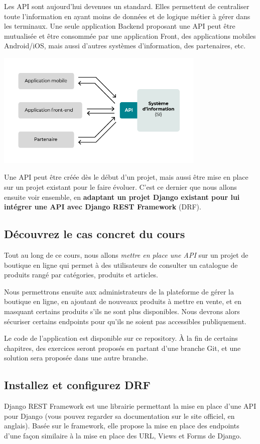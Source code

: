 \documentclass[a4paper]{article}
\begin{document}
Les API sont aujourd’hui devenues un standard. Elles permettent de centraliser toute l’information en ayant moins de données et de logique métier à gérer dans les terminaux. Une seule application Backend proposant une API peut être mutualisée et être consommée par une application Front, des applications mobiles Android/iOS, mais aussi d’autres systèmes d’information, des partenaires, etc.

\begin{center}
\includegraphics[width=10cm]{images/image01.png}
\end{center}

Une API peut être créée dès le début d’un projet, mais aussi être mise en place sur un projet existant pour le faire évoluer. C’est ce dernier que nous allons ensuite voir ensemble, en {\bf adaptant un projet Django existant pour lui intégrer une API avec {\color{monOrange}Django REST Framework}} (DRF).
\subsection{Découvrez le cas concret du cours}
Tout au long de ce cours, nous allons {\em mettre en place une {\color{monOrange}API}} sur un projet de boutique en ligne qui permet à des utilisateurs de consulter un catalogue de produits rangé par catégories, produits et articles. 

Nous permettrons ensuite aux {\color{monOrange}administrateurs de la plateforme de gérer la boutique} en ligne, en ajoutant de nouveaux produits à mettre en vente, et en masquant certains produits s’ils ne sont plus disponibles. Nous devrons alors sécuriser certains endpoints pour qu’ils ne soient pas accessibles publiquement.

Le code de l’application est disponible sur ce repository. À la fin de certains chapitres, des exercices seront proposés en partant d’une branche {\color{monOrange}Git}, et une solution sera proposée dans une autre branche.
\subsection{Installez et configurez {\color{monOrange}DRF}}
Django REST Framework est une librairie permettant la mise en place d’une API pour Django (vous pouvez regarder sa documentation sur le site officiel, en anglais). Basée sur le framework, elle propose la mise en place des endpoints d’une façon similaire à la mise en place des URL, Views et Forms de Django.
\end{document}
